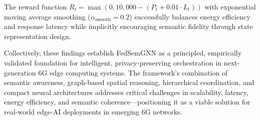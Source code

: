 The reward function $R_t = \max(0, 10{,}000 - (P_t + 0.01 \cdot L_t))$ with exponential moving average smoothing ($\alpha_{\text{smooth}} = 0.2$) successfully balances energy efficiency and response latency while implicitly encouraging semantic fidelity through state representation design.

Collectively, these findings establish FedSemGNN as a principled, empirically validated foundation for intelligent, privacy-preserving orchestration in next-generation 6G edge computing systems. The framework's combination of semantic awareness, graph-based spatial reasoning, hierarchical coordination, and compact neural architectures addresses critical challenges in scalability, latency, energy efficiency, and semantic coherence—positioning it as a viable solution for real-world edge-AI deployments in emerging 6G networks.
